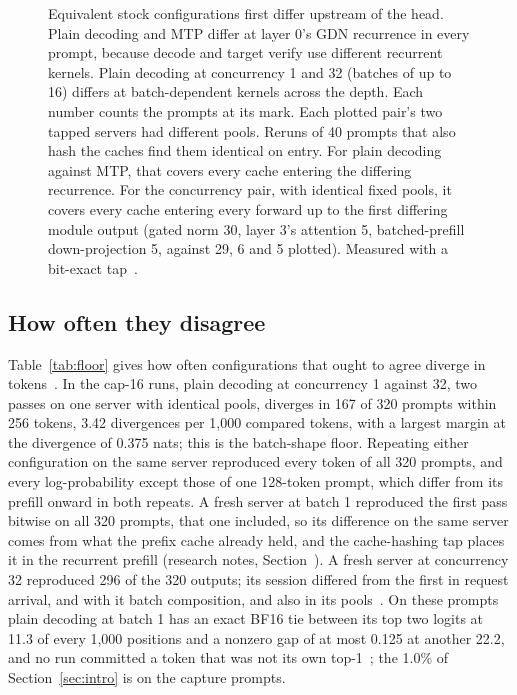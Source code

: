 \begin{figure}[htbp]
\centering
%
\caption{Equivalent stock configurations first differ upstream of the head. Plain decoding and MTP differ at layer 0's GDN recurrence in every prompt, because decode and target verify use different recurrent kernels. Plain decoding at concurrency 1 and 32 (batches of up to 16) differs at batch-dependent kernels across the depth. Each number counts the prompts at its mark. Each plotted pair's two tapped servers had different pools. Reruns of 40 prompts that also hash the caches find them identical on entry. For plain decoding against MTP, that covers every cache entering the differing recurrence. For the concurrency pair, with identical fixed pools, it covers every cache entering every forward up to the first differing module output (gated norm 30, layer 3's attention 5, batched-prefill down-projection 5, against 29, 6 and 5 plotted). Measured with a bit-exact tap~.}
\label{fig:divergence}
\end{figure}

\subsection{How often they disagree}\label{app:divergence-rates}
Table~\ref{tab:floor} gives how often configurations that ought to agree diverge in tokens~. In the cap-16 runs, plain decoding at concurrency 1 against 32, two passes on one server with identical pools, diverges in 167 of 320 prompts within 256 tokens, 3.42 divergences per 1,000 compared tokens, with a largest margin at the divergence of 0.375 nats; this is the batch-shape floor. Repeating either configuration on the same server reproduced every token of all 320 prompts, and every log-probability except those of one 128-token prompt, which differ from its prefill onward in both repeats. A fresh server at batch 1 reproduced the first pass bitwise on all 320 prompts, that one included, so its difference on the same server comes from what the prefix cache already held, and the cache-hashing tap places it in the recurrent prefill (research notes, Section~). A fresh server at concurrency 32 reproduced 296 of the 320 outputs; its session differed from the first in request arrival, and with it batch composition, and also in its pools~. On these prompts plain decoding at batch 1 has an exact BF16 tie between its top two logits at 11.3 of every 1,000 positions and a nonzero gap of at most 0.125 at another 22.2, and no run committed a token that was not its own top-1~; the 1.0\% of Section~\ref{sec:intro} is on the capture prompts.

